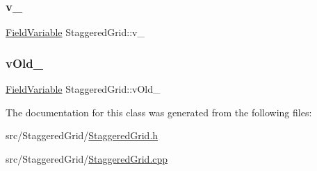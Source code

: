 \mbox{\label{classStaggeredGrid_a20ec43568fe937b194561e21a0b84ad9}} 
\subsubsection{\texorpdfstring{v\_}{v\_}}
{\footnotesize\ttfamily \mbox{\hyperlink{classFieldVariable}{Field\+Variable}} Staggered\+Grid\+::v\+\_\+\hspace{0.3cm}{\ttfamily [protected]}}

\mbox{\label{classStaggeredGrid_ac7e8b1b8a9b054eda5e7c2630d71374a}} 
\subsubsection{\texorpdfstring{vOld\_}{vOld\_}}
{\footnotesize\ttfamily \mbox{\hyperlink{classFieldVariable}{Field\+Variable}} Staggered\+Grid\+::v\+Old\+\_\+\hspace{0.3cm}{\ttfamily [protected]}}



The documentation for this class was generated from the following files\+:\begin{DoxyCompactItemize}
\item 
src/\+Staggered\+Grid/\mbox{\hyperlink{StaggeredGrid_8h}{Staggered\+Grid.\+h}}\item 
src/\+Staggered\+Grid/\mbox{\hyperlink{StaggeredGrid_8cpp}{Staggered\+Grid.\+cpp}}\end{DoxyCompactItemize}
